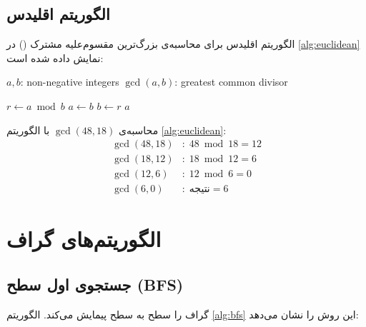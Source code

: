 \documentclass{matinbook}
\begin{document}
\section{الگوریتم اقلیدس}
\label{sec:sorting-euclidean}

الگوریتم اقلیدس برای محاسبه‌ی
بزرگ‌ترین مقسوم‌علیه مشترک () در
\cref{alg:euclidean} نمایش داده شده است:

\begin{latin}
\begin{algorithm}
\caption{الگوریتم اقلیدس برای $\gcd(a, b)$}
\label{alg:euclidean}
\begin{algorithmic}[1]
    \Require $a, b$: non-negative integers
    \Ensure $\gcd(a, b)$: greatest common divisor

        \State $r \gets a \bmod b$
        \State $a \gets b$
        \State $b \gets r$
    \EndWhile
    \State \Return $a$
\end{algorithmic}
\end{algorithm}
\end{latin}

\begin{example}
    محاسبه‌ی $\gcd(48, 18)$ با الگوریتم
    \cref{alg:euclidean}:
    \begin{align*}
        \gcd(48, 18) &: \; 48 \bmod 18 = 12 \\
        \gcd(18, 12) &: \; 18 \bmod 12 = 6 \\
        \gcd(12, 6)  &: \; 12 \bmod 6 = 0 \\
        \gcd(6, 0)   &: \; \text{نتیجه} = 6
    \end{align*}
    \label{ex:gcd-example}
\end{example}

\chapter{الگوریتم‌های گراف}
\label{chap:graph}

\section{جستجوی اول سطح (BFS)}
\label{sec:graph-bfs}

 گراف را
سطح به سطح پیمایش می‌کند. الگوریتم \cref{alg:bfs}
این روش را نشان می‌دهد:
\end{document}
